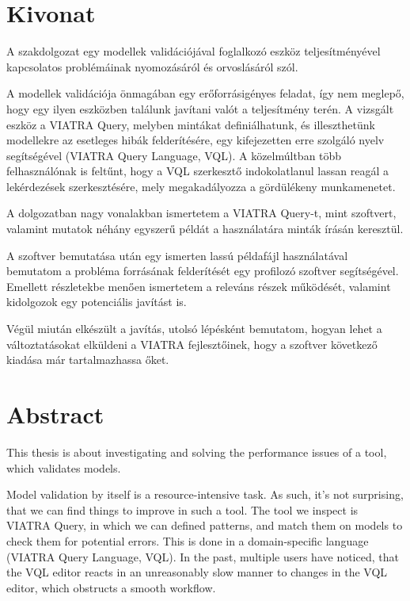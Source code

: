 \documentclass[11pt,a4paper,oneside]{report}
\begin{document}
\selectthesislanguage

\tableofcontents\cleardoublepage



\setcounter{page}{1}

\selecthungarian
\chapter*{Kivonat}
A szakdolgozat egy modellek validációjával foglalkozó eszköz teljesítményével
kapcsolatos problémáinak nyomozásáról és orvoslásáról szól.

A modellek validációja önmagában egy erőforrásigényes feladat, így nem
meglepő, hogy egy ilyen eszközben találunk javítani valót a teljesítmény terén.
A vizsgált eszköz a VIATRA Query, melyben mintákat definiálhatunk, és
illeszthetünk modellekre az esetleges hibák felderítésére, egy kifejezetten erre
szolgáló nyelv segítségével (VIATRA Query Language, VQL). A közelmúltban több
felhasználónak is feltűnt, hogy a VQL szerkesztő indokolatlanul lassan reagál
a lekérdezések szerkesztésére, mely megakadályozza a gördülékeny munkamenetet.

A dolgozatban nagy vonalakban ismertetem a VIATRA Query-t, mint szoftvert,
valamint mutatok néhány egyszerű példát a használatára minták írásán keresztül.

A szoftver bemutatása után egy ismerten lassú példafájl használatával bemutatom
a probléma forrásának felderítését egy profilozó szoftver segítségével. Emellett
részletekbe menően ismertetem a releváns részek működését, valamint kidolgozok
egy potenciális javítást is.

Végül miután elkészült a javítás, utolsó lépésként bemutatom, hogyan lehet a
változtatásokat elküldeni a VIATRA fejlesztőinek, hogy a szoftver következő
kiadása már tartalmazhassa őket.
\vfill

\selectenglish
\chapter*{Abstract}
This thesis is about investigating and solving the performance issues of a tool,
which validates models.

Model validation by itself is a resource-intensive task. As such, it's not
surprising, that we can find things to improve in such a tool.
The tool we inspect is VIATRA Query, in which we can defined patterns, and match
them on models to check them for potential errors. This is done in a
domain-specific language (VIATRA Query Language, VQL). In the past, multiple
users have noticed, that the VQL editor reacts in an unreasonably slow manner to
changes in the VQL editor, which obstructs a smooth workflow.
\end{document}
